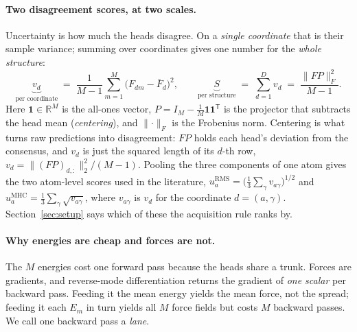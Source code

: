 \documentclass{article}
\begin{document}
\paragraph{Two disagreement scores, at two scales.}
Uncertainty is how much the heads disagree. On a \emph{single coordinate} that is their sample
variance; summing over coordinates gives one number for the \emph{whole structure}:
\begin{equation}
\underbrace{v_d}_{\text{per coordinate}}\;=\;\frac{1}{M-1}\sum_{m=1}^{M}\bigl(F_{dm}-\bar F_d\bigr)^2 ,
\qquad
\underbrace{S}_{\text{per structure}}\;=\;\sum_{d=1}^{D} v_d\;=\;\frac{\lVert FP\rVert_F^2}{M-1} .
\end{equation}
Here $\mathbf 1\in\mathbb{R}^{M}$ is the all-ones vector,
$P=I_M-\tfrac{1}{M}\mathbf 1\mathbf 1^{\mathsf T}$ is the projector that subtracts the head mean
(\emph{centering}), and $\lVert\cdot\rVert_F$ is the Frobenius norm. Centering is what turns raw
predictions into disagreement: $FP$ holds each head's deviation from the consensus, and $v_d$ is
just the squared length of its $d$-th row, $v_d=\lVert (FP)_{d,:}\rVert_2^2/(M-1)$. Pooling the
three components of one atom gives the two atom-level scores used in the literature,
$u_a^{\mathrm{RMS}}=\bigl(\tfrac13\sum_{\gamma}v_{a\gamma}\bigr)^{1/2}$ and
$u_a^{\mathrm{MHC}}=\tfrac13\sum_{\gamma}\sqrt{v_{a\gamma}}$, where $v_{a\gamma}$ is $v_d$ for the
coordinate $d=(a,\gamma)$. Section~\ref{sec:setup} says which of these the acquisition rule ranks by.

\paragraph{Why energies are cheap and forces are not.}
The $M$ energies cost one forward pass because the heads share a trunk. Forces are gradients, and
reverse-mode differentiation returns the gradient of \emph{one scalar} per backward pass. Feeding it
the mean energy yields the mean force, not the spread; feeding it each $E_m$ in turn yields all $M$
force fields but costs $M$ backward passes. We call one backward pass a \emph{lane}.
\end{document}

